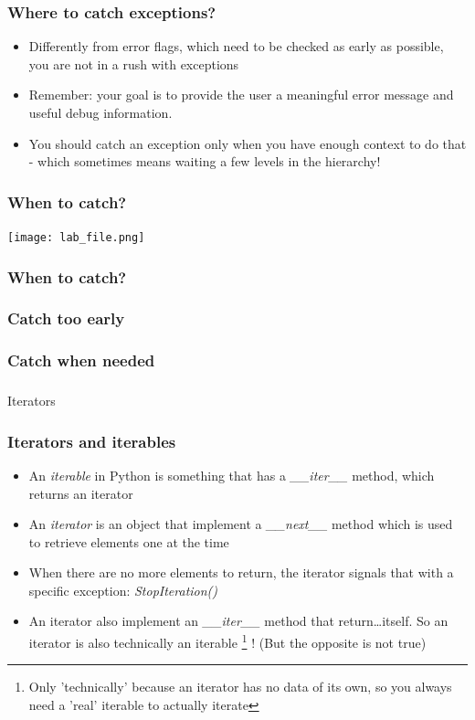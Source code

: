 \documentclass[9pt]{beamer}
\begin{document}
\begin{frame}
  \frametitle{Where to catch exceptions?}
  \begin{itemize}
    \item Differently from error flags, which need to be checked as early as
          possible, you are not in a rush with exceptions
    \item Remember: your goal is to provide the user a meaningful error message and
          useful debug information.
    \item You should catch an exception only when you have enough context to
          do that - which sometimes means waiting a few levels in the hierarchy!
  \end{itemize}
\end{frame}


\begin{frame}
  \frametitle{When to catch?}
  \centering
  \texttt{[image: lab\_file.png]}
\end{frame}


\begin{frame}
  \frametitle{When to catch?}
  
\end{frame}


\begin{frame}
  \frametitle{Catch too early}
  
\end{frame}


\begin{frame}
  \frametitle{Catch when needed}
  
\end{frame}


\begin{frame}
  \frametitle{}
  \centering \Large Iterators
\end{frame}


\begin{frame}
  \frametitle{Iterators and iterables}

  \begin{itemize}
    \item An \emph{iterable} in Python is something that has a \emph{\_\_iter\_\_}
          method, which returns an \alert{iterator}
    \medskip
    \item An \emph{iterator} is an object that implement a \emph{\_\_next\_\_} method
          which is used to retrieve elements one at the time
    \medskip
    \item When there are no more elements to return, the iterator signals that with a specific
          exception: \emph{StopIteration()}
    \medskip
    \item An iterator also implement an \emph{\_\_iter\_\_} method that return\dots itself.
          So an iterator is also technically an iterable%
          \footnote{Only 'technically' because an iterator has no data of its
          own, so you always need a 'real' iterable to actually iterate}%
          ! (But the opposite is not true)
  \end{itemize}

\end{frame}
\end{document}
